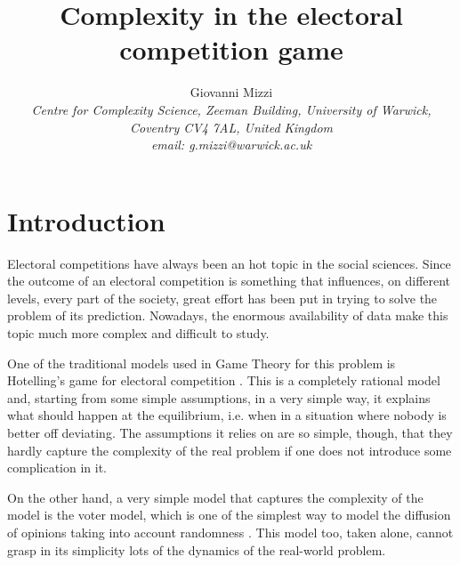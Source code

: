 \documentclass[11pt,a4paper,twocolumn]{article}
\author{Giovanni Mizzi\\ 
\small \textit{Centre for Complexity Science, Zeeman Building, University of Warwick,} \\
\small \textit{Coventry CV4 7AL, United Kingdom}\\ 
\small \textit{email: g.mizzi@warwick.ac.uk}}
\title{\Huge Complexity in the electoral competition game}
\date{}
\begin{document}

\section{Introduction}
\vspace*{-0.2cm}
Electoral competitions have always been an hot topic in the social sciences. Since the outcome of an electoral competition is something that influences, on different levels, every part of the society, great effort has been put in trying to solve the problem of its prediction.
Nowadays, the enormous availability of data make this topic much more complex and difficult to study. 

One of the traditional models used in Game Theory for this problem is Hotelling's game for electoral competition \cite{Hotelling1929}. This is a completely rational model and, starting from some simple assumptions, in a very simple way, it explains what should happen at the equilibrium, i.e. when in a situation where nobody is better off deviating. The assumptions it relies on are so simple, though, that they hardly capture the complexity of the real problem if one does not introduce some complication in it.

On the other hand, a very simple model that captures the complexity of the model is the voter model, which is one of the simplest way to model the diffusion of opinions taking into account randomness \cite{Clifford1973}. This model too, taken alone, cannot grasp in its simplicity lots of the dynamics of the real-world problem.
\end{document}
